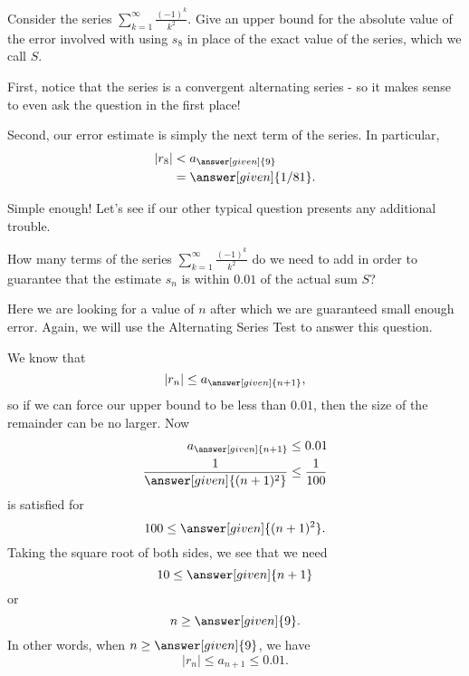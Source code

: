 \documentclass{ximera}
\begin{document}
%
\begin{example}
Consider the series $\sum_{k=1}^\infty \frac{(-1)^k}{k^2}$.  Give an upper bound for the absolute value of the error involved with using $s_8$ in place of the exact value of the series, which we call $S$.

\begin{explanation}
First, notice that the series is a convergent alternating series - so it makes sense to even ask the question in the first place!

Second, our error estimate is simply the next term of the series.  In particular, 
\begin{align*}
\vert r_8 \vert &< a_{\answer[given]{9}}\\
 &= \answer[given]{1/81}.
\end{align*}
\end{explanation}

\end{example}

Simple enough!  Let's see if our other typical question presents any additional trouble.

\begin{example}
How many terms of the series $\sum_{k=1}^{\infty}\frac{(-1)^k}{k^2}$ do we need to add in order to guarantee that the estimate $s_n$ is within $0.01$ of the actual sum $S$?
\begin{explanation}
Here we are looking for a value of $n$ after which we are guaranteed small enough error.  Again, we will use the Alternating Series Test to answer this question.

We know that
\[
\vert r_n \vert \leq a_{\answer[given]{n+1}},
\]
so if we can force our upper bound to be less than $0.01$, then the size of the remainder can be no larger.  Now
\begin{align*}
   a_{\answer[given]{n+1}} &\leq 0.01 \\
   \frac{1}{ \answer[given]{(n+1)^2}} & \leq \frac{1}{100}
\end{align*}
is satisfied for 
\[
100 \leq \answer[given]{(n+1)^2}.
\]
Taking the square root of both sides, we see that we need
\[
10 \leq \answer[given]{n+1}
\]
or
\[
n \geq \answer[given]{9}.
\]
In other words, when $n \geq \answer[given]{9}$, we have
\[
\vert r_n \vert \leq a_{n+1} \leq 0.01.
\]
\end{explanation}
\end{example}
\end{document}
